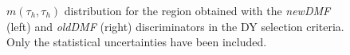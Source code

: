 \begin{figure}[ht]
\begin{center}
\captionsetup[subfloat]{farskip=0pt,captionskip=0.0cm,labelformat=empty}
\caption{$m(\tau_{h},\tau_{h})$ distribution for the region obtained 
with the \textit{newDMF} (left) and \textit{oldDMF} (right) discriminators in the DY 
selection criteria. Only the statistical uncertainties have been included. \label{fig:dmfappendix}}
\end{center}
\end{figure}

